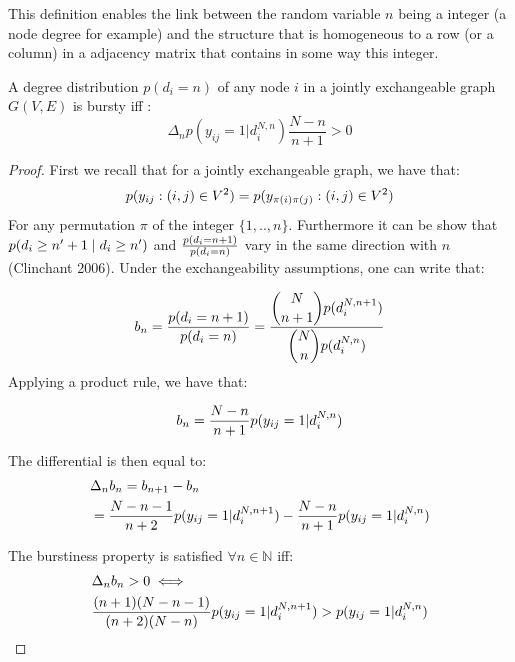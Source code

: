 This definition enables the link between the random variable $n$ being a integer (a node degree for example) and the structure that is homogeneous to a row (or a column) in a adjacency matrix that contains in some way this integer.

\begin{theorem} \label{th:burst_exch}
	 A degree distribution $p(d_i=n)$ of any node $i$ in a jointly exchangeable graph $G(V,E)$ is bursty iff :
	\begin{equation}
	 \Delta_n  p(y_{ij}=1 | d_i^{N,n}) \frac{N-n}{n+1} > 0
	\end{equation}

\end{theorem}

\begin{proof} 	\label{proof:glob}
	First we recall that for a jointly exchangeable graph, we have that:
	\begin{equation*}
	p(y_{ij}: (i,j) \in V^2) = p(y_{\pi(i)\pi(j)}: (i,j) \in V^2)
	\end{equation*}
	For any permutation $\pi$ of the integer $\{1,..,n\}$. Furthermore it can be show that $ p(d_i \geq n'+1 \mid d_i \geq n')$ and $\frac{p(d_i=n+1)}{p(d_i=n)}$ vary in the same direction with $n$ (Clinchant 2006). Under the exchangeability assumptions, one can write that:
	
	\begin{align*}
	 b_n=\frac{p(d_i=n+1)}{p(d_i=n)} = \frac{\dbinom{N}{n+1} p(d_i^{N,n+1})}{\dbinom{N}{n} p(d_i^{N,n})}
	\end{align*}
 Applying a product rule, we have that:
	
	\begin{equation*}
	b_n = \frac{N-n}{n+1} p(y_{ij}=1 | d_i^{N,n})
	\end{equation*}
	
	The differential is then equal to:
	\begin{align*}
	&\Delta_n b_n= b_{n+1} - b_n  \\
	&= \frac{N-n-1}{n+2} p(y_{ij}=1 | d_i^{N,n+1}) - \frac{N-n}{n+1} p(y_{ij}=1 | d_i^{N,n})
	\end{align*}
	
	The burstiness property is satisfied  $\forall n \in \mathbb{N}$ iff:
	\begin{align*}
	&\Delta_nb_n > 0 \iff \\
	& \frac{(n+1)(N-n-1)}{(n+2)(N-n)}p(y_{ij}=1 | d_i^{N,n+1})  > p(y_{ij}=1 | d_i^{N,n})
	\end{align*}
	\label{b-theorem}
\end{proof}
	
